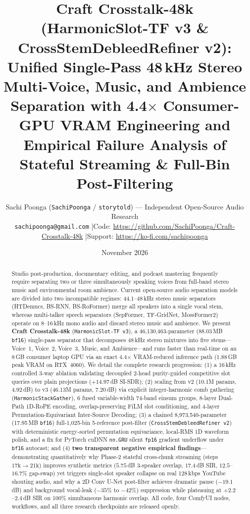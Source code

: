 \documentclass[10pt,a4paper]{article}
\title{\textbf{Craft Crosstalk-48k (HarmonicSlot-TF v3 \& CrossStemDebleedRefiner v2):\\Unified Single-Pass 48\,kHz Stereo Multi-Voice, Music, and Ambience Separation with 4.4$\times$ Consumer-GPU VRAM Engineering and Empirical Failure Analysis of Stateful Streaming \& Full-Bin Post-Filtering}}
\author{
  Sachi Poonga (\texttt{SachiPoonga} / \texttt{storytold}) --- Independent Open-Source Audio Research\\
  \texttt{sachipoonga@gmail.com} \quad|\quad Code: \url{https://github.com/SachiPoonga/Craft-Crosstalk-48k} \quad|\quad Support: \url{https://ko-fi.com/sachipoonga}
}
\date{November 2026}
\begin{document}
\maketitle

\begin{abstract}
Studio post-production, documentary editing, and podcast mastering frequently require separating two or three simultaneously speaking voices from full-band stereo music and environmental room ambience. Current open-source audio separation models are divided into two incompatible regimes: 44.1--48\,kHz stereo music separators (HTDemucs, BS-RNN, BS-RoFormer) merge all speakers into a single vocal stem, whereas multi-talker speech separators (SepFormer, TF-GridNet, MossFormer2) operate on 8--16\,kHz mono audio and discard stereo music and ambience. We present \textbf{Craft Crosstalk-48k} (\texttt{HarmonicSlot-TF v3}), a 46,130,463-parameter (88.03\,MB \texttt{bf16}) single-pass separator that decomposes 48\,kHz stereo mixtures into five stems---Voice~1, Voice~2, Voice~3, Music, and Ambience---and runs faster than real-time on an 8\,GB consumer laptop GPU via an exact 4.4$\times$ VRAM-reduced inference path (1.88\,GB peak VRAM on RTX~4060). We detail the complete research progression: (1) a 16\,kHz controlled 3-way ablation validating decoupled 2-head purity-guided competitive slot queries over plain projections ($+14.97$\,dB SI-SDR); (2) scaling from v2 (10.1M params, $4.92$\,dB) to v3 (46.13M params, $7.20$\,dB) via explicit integer-harmonic comb gathering (\texttt{HarmonicStackGather}), 6 fused variable-width 74-band einsum groups, 8-layer Dual-Path 1D-RoPE encoding, overlap-preserving FiLM slot conditioning, and 4-layer Permutation-Equivariant Inter-Source Decoding; (3) a chained 8,973,540-parameter (17.95\,MB \texttt{bf16}) full-1,025-bin 5-reference post-filter (\texttt{CrossStemDebleedRefiner v2}) with deterministic energy-sorted permutation equivariance, local-RMS 1D waveform polish, and a fix for PyTorch cuDNN \texttt{nn.GRU} silent \texttt{fp16} gradient underflow under \texttt{bf16} autocast; and (4) \textbf{two transparent negative empirical findings}---demonstrating quantitatively why Phase-2 stateful cross-chunk streaming (steps $17\text{k}\to 21\text{k}$) improves synthetic metrics ($5.75$\,dB 3-speaker overlap, $17.4$\,dB SIR, $12.5$--$16.7\%$ gap-swap) yet triggers single-slot speaker collapse on real 128\,kbps YouTube shouting audio, and why a 2D Conv U-Net post-filter achieves dramatic pause ($-19.1$\,dB) and background vocal-leak ($-35\%$ to $-42\%$) suppression while plateauing at $+2.2$--$2.4$\,dB SIR on 100\% simultaneous harmonic overlap. All code, four ComfyUI nodes, workflows, and all three research checkpoints are released openly.
\end{abstract}
\end{document}
